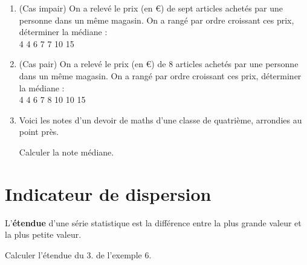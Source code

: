 \documentclass[a4paper]{book}
\begin{document}
    \begin{exemple}
        \begin{enumerate}
            \item (Cas impair) On a relevé le prix (en €) de sept articles achetés par une personne dans un même magasin. On a rangé par ordre croissant ces prix, déterminer la médiane : \\
            4 \hspace{0.5cm} 4 \hspace{0.5cm} 6 \hspace{0.5cm} 7 \hspace{0.5cm} 7 \hspace{0.5cm} 10 \hspace{0.5cm} 15

            \item (Cas pair) On a relevé le prix (en €) de 8 articles achetés par une personne dans un même magasin. On a rangé par ordre croissant ces prix, déterminer la médiane : \\
            4 \hspace{0.5cm} 4 \hspace{0.5cm} 6 \hspace{0.5cm} 7 \hspace{0.5cm} 8 \hspace{0.5cm} 10 \hspace{0.5cm} 10 \hspace{0.5cm} 15
            
            \item Voici les notes d’un devoir de maths d’une classe de quatrième, arrondies au point près.

            \begin{center}\end{center} 
            
            Calculer la note médiane.
        \end{enumerate}
    \end{exemple}


\section{Indicateur de dispersion}
    \begin{definition}[Etendue]
        L'\textbf{étendue} d'une série statistique est la différence entre la plus grande valeur et la plus petite valeur.
    \end{definition}


    \begin{exemple}
        Calculer l'étendue du 3. de l'exemple 6.
    \end{exemple}
\end{document}
